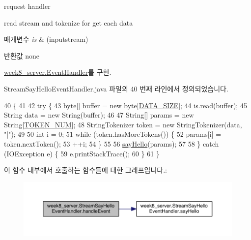 request handler 

read stream and tokenize for get each data 
\begin{DoxyParams}{매개변수}
{\em is} & (inputstream) \\
\hline
\end{DoxyParams}
\begin{DoxyReturn}{반환값}
none 
\end{DoxyReturn}


\hyperlink{interfaceweek8__server_1_1_event_handler_a24d2832c020ae27428c12be6d5277e51}{week8\-\_\-server.\-Event\-Handler}를 구현.



Stream\-Say\-Hello\-Event\-Handler.\-java 파일의 40 번째 라인에서 정의되었습니다.


\begin{DoxyCode}
40                                             \{
41 
42         \textcolor{keywordflow}{try} \{
43             byte[] buffer = \textcolor{keyword}{new} byte[\hyperlink{classweek8__server_1_1_stream_say_hello_event_handler_aaaadade47c5c1093fa1b82e876039036}{DATA\_SIZE}];
44             is.read(buffer);
45             String data = \textcolor{keyword}{new} String(buffer);
46 
47             String[] params = \textcolor{keyword}{new} String[\hyperlink{classweek8__server_1_1_stream_say_hello_event_handler_aa6b191144a3deebb3779ddad8a10850d}{TOKEN\_NUM}];
48             StringTokenizer token = \textcolor{keyword}{new} StringTokenizer(data, \textcolor{stringliteral}{"|"});
49 
50             \textcolor{keywordtype}{int} i = 0;
51             \textcolor{keywordflow}{while} (token.hasMoreTokens()) \{
52                 params[i] = token.nextToken();
53                 ++i;
54             \}
55 
56             \hyperlink{classweek8__server_1_1_stream_say_hello_event_handler_ad250ce0474a5ef1f7820ac2f03bac221}{sayHello}(params);
57 
58         \} \textcolor{keywordflow}{catch} (IOException e) \{
59             e.printStackTrace();
60         \}
61     \}
\end{DoxyCode}


이 함수 내부에서 호출하는 함수들에 대한 그래프입니다.\-:
\nopagebreak
\begin{figure}[H]
\begin{center}
\leavevmode
\includegraphics[width=350pt]{classweek8__server_1_1_stream_say_hello_event_handler_a2c2be02c3987ca818d6c09fd800d0f34_cgraph}
\end{center}
\end{figure}


